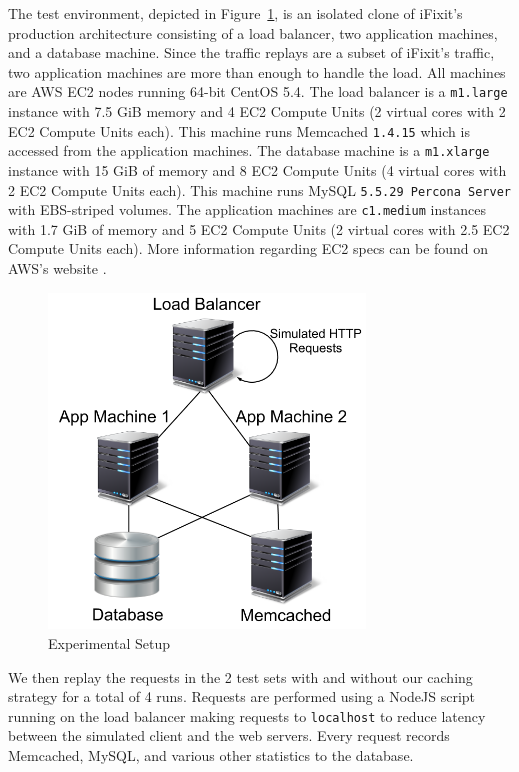 \documentclass[12pt]{ucthesis}
\begin{document}
The test environment, depicted in Figure~\ref{fig:experimentalArchitecture}, is an isolated clone of \textsf{iFixit}'s production architecture consisting of a load balancer, two application machines, and a database machine.
Since the traffic replays are a subset of \textsf{iFixit}'s traffic, two application machines are more than enough to handle the load.
All machines are AWS EC2 nodes running 64-bit CentOS 5.4.
The load balancer is a {\tt m1.large} instance with 7.5 GiB memory and 4 EC2 Compute Units (2 virtual cores with 2 EC2 Compute Units each).
This machine runs \textsf{Memcached} {\tt 1.4.15} which is accessed from the application machines.
The database machine is a {\tt m1.xlarge} instance with 15 GiB of memory and 8 EC2 Compute Units (4 virtual cores with 2 EC2 Compute Units each).
This machine runs \textsf{MySQL} {\tt 5.5.29 Percona Server} with EBS-striped volumes.
The application machines are {\tt c1.medium} instances with 1.7 GiB of memory and 5 EC2 Compute Units (2 virtual cores with 2.5 EC2 Compute Units each).
More information regarding EC2 specs can be found on AWS's website \cite{awsInstanceTypes}.

\begin{figure}[h]
\centering
\includegraphics[width=0.75\textwidth]{assets/experimentalArchitecture.png}
\caption{Experimental Setup}
\label{fig:experimentalArchitecture}
\end{figure}

We then replay the requests in the 2 test sets with and without our caching strategy for a total of 4 runs.
Requests are performed using a NodeJS script running on the load balancer making requests to {\tt localhost} to reduce latency between the simulated client and the web servers.
Every request records \textsf{Memcached}, \textsf{MySQL}, and various other statistics to the database.
\end{document}
